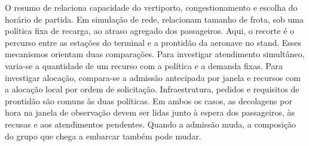 O resumo de \citet{qin2026commuting} relaciona capacidade do vertiporto, congestionamento e escolha do horário de partida. Em simulação de rede, \citet{onat2024} relacionam tamanho de frota, sob uma política fixa de recarga, ao atraso agregado dos passageiros. Aqui, o recorte é o percurso entre as estações do terminal e a prontidão da aeronave no stand. Esses mecanismos orientam duas comparações. Para investigar atendimento simultâneo, varia-se a quantidade de um recurso com a política e a demanda fixas. Para investigar alocação, compara-se a admissão antecipada por janela e recursos com a alocação local por ordem de solicitação. Infraestrutura, pedidos e requisitos de prontidão são comuns às duas políticas. Em ambos os casos, as decolagens por hora na janela de observação devem ser lidas junto à espera dos passageiros, às recusas e aos atendimentos pendentes. Quando a admissão muda, a composição do grupo que chega a embarcar também pode mudar.
